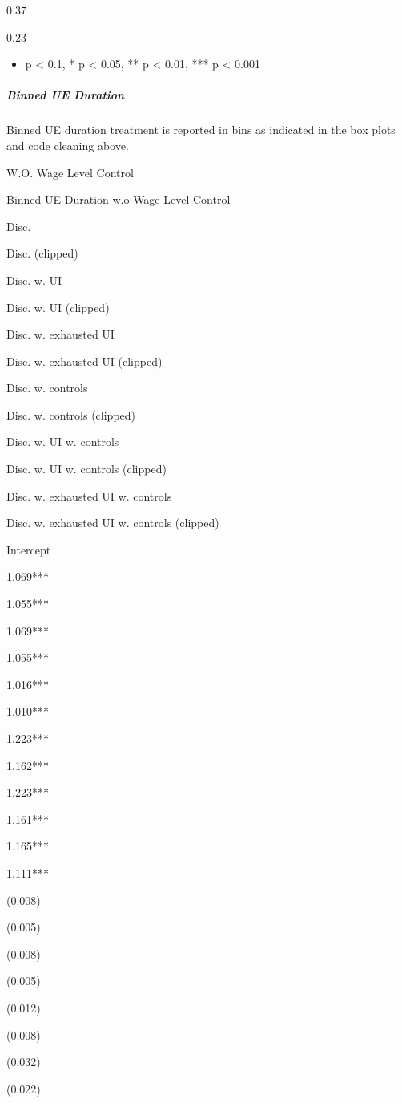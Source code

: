 0.37

0.23

\begin{itemize}
\tightlist
\item
  p \textless{} 0.1, * p \textless{} 0.05, ** p \textless{} 0.01, *** p
  \textless{} 0.001
\end{itemize}

\subparagraph{Binned UE Duration}\label{binned-ue-duration}

Binned UE duration treatment is reported in bins as indicated in the box
plots and code cleaning above.

W.O. Wage Level Control

\label{nzwimfwpub}
Binned UE Duration w.o Wage Level Control

Disc.

Disc. (clipped)

Disc. w. UI

Disc. w. UI (clipped)

Disc. w. exhausted UI

Disc. w. exhausted UI (clipped)

Disc. w. controls

Disc. w. controls (clipped)

Disc. w. UI w. controls

Disc. w. UI w. controls (clipped)

Disc. w. exhausted UI w. controls

Disc. w. exhausted UI w. controls (clipped)

Intercept

1.069***

1.055***

1.069***

1.055***

1.016***

1.010***

1.223***

1.162***

1.223***

1.161***

1.165***

1.111***

(0.008)

(0.005)

(0.008)

(0.005)

(0.012)

(0.008)

(0.032)

(0.022)

